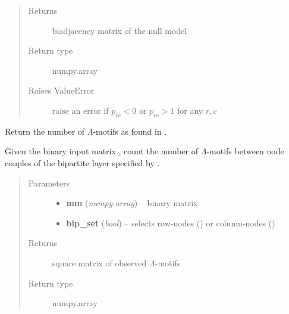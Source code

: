 \documentclass[letterpaper,10pt,english]{sphinxmanual}
\begin{document}
\begin{fulllineitems}
\begin{fulllineitems}
\begin{quote}
\begin{description}
\item[{Returns}] \leavevmode
biadjacency matrix of the null model

\item[{Return type}] \leavevmode
numpy.array

\item[{Raises ValueError}] \leavevmode
raise an error if \(p_{rc} < 0\) or
\(p_{rc} > 1\) for any \(r, c\)

\end{description}\end{quote}

\end{fulllineitems}


\begin{fulllineitems}
\label{source/src:src.bicm.BiCM.get_lambda_motif_matrix}
Return the number of \(\Lambda\)-motifs as found in .

Given the binary input matrix , count the number of
\(\Lambda\)-motifs between node couples of the bipartite layer
specified by .
\begin{quote}\begin{description}
\item[{Parameters}] \leavevmode\begin{itemize}
\item {} 
\textbf{mm} (\emph{numpy.array}) -- binary matrix

\item {} 
\textbf{bip\_set} (\emph{bool}) -- selects row-nodes () or column-nodes ()

\end{itemize}

\item[{Returns}] \leavevmode
square matrix of observed \(\Lambda\)-motifs

\item[{Return type}] \leavevmode
numpy.array

\end{description}\end{quote}

\end{fulllineitems}



\end{fulllineitems}
\end{document}
